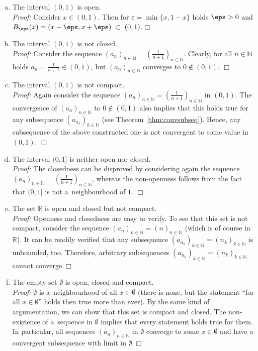 \begin{example}
 \begin{enumerate}[(a)]
\item The interval $(0,1)$ is open. \\
{\em Proof:} Consider $x\in(0,1)$. Then for $\varepsilon=\min\{x,1-x\}$ holds $\eps>0$ and \linebreak$B_\eps(x)=(x-\eps,x+\eps)\;\subset\;(0,1)$.\hfill$\Box$
\item The interval $(0,1)$ is not closed.\\
{\em Proof:} Consider the sequence $(a_n)_{n\in\mathbb{N}}=(\frac1{n+1})_{n\in\mathbb{N}}$. Clearly, for all $n\in\mathbb{N}$ holds $a_n=\frac1{n+1}\in(0,1)$, but $(a_n)_{n\in\mathbb{N}}$ converges to $0\notin(0,1)$.
\hfill$\Box$
\item The interval $(0,1)$ is not compact.\\
{\em Proof:} Again consider the sequence $(a_n)_{n\in\mathbb{N}}=(\frac1{n+1})_{n\in\mathbb{N}}$ in $(0,1)$. The convergence of $(a_n)_{n\in\mathbb{N}}$ to $0\notin(0,1)$ also implies that this holds true for any subsequence $(a_{n_k})_{k\in\mathbb{N}}$ (see Theorem~\ref{thm:convsubseq}). Hence, any subsequence of the above constructed one is not convergent to some value in $(0,1)$.
\hfill$\Box$
\item The interval $(0,1]$ is neither open nor closed.\\
{\em Proof:} The closedness can be disproved by considering again the sequence \linebreak$(a_n)_{n\in\mathbb{N}}=(\frac1{n+1})_{n\in\mathbb{N}}$, whereas the non-openness follows from the fact that $(0,1]$ is not a~neighbourhood of $1$.
\hfill$\Box$
\item The set $\mathbb{R}$ is open and closed but not compact.\\
{\em Proof:} Openness and closedness are easy to verify. To see that this set is not compact, consider the sequence $(a_n)_{n\in\mathbb{N}}=(n)_{n\in\mathbb{N}}$ (which is of course in $\mathbb{R}$). It can be readily verified that any subsequence $(a_{n_k})_{k\in\mathbb{N}}=(n_k)_{k\in\mathbb{N}}$ is unbounded, too. Therefore, arbitrary subsequences $(a_{n_k})_{k\in\mathbb{N}}=(n_k)_{k\in\mathbb{N}}$ cannot converge.\hfill$\Box$
\item The empty set $\emptyset$ is open, closed and compact.\\
{\em Proof:}
$\emptyset$ is a~neighbourhood of all $x\in\emptyset$ (there is none, but the statement ``for all $x\in\emptyset$'' holds then true more than ever). By the same kind of argumentation, we can show that this set is compact and closed. The non-existence of a~sequence in $\emptyset$ implies that every statement holds true for them. In particular, all sequences $(a_{n})_{n\in\mathbb{N}}$ in $\emptyset$ converge to some $x\in\emptyset$ and have a convergent subsequence with limit in $\emptyset$.\hfill$\Box$
\end{enumerate}
\end{example}

